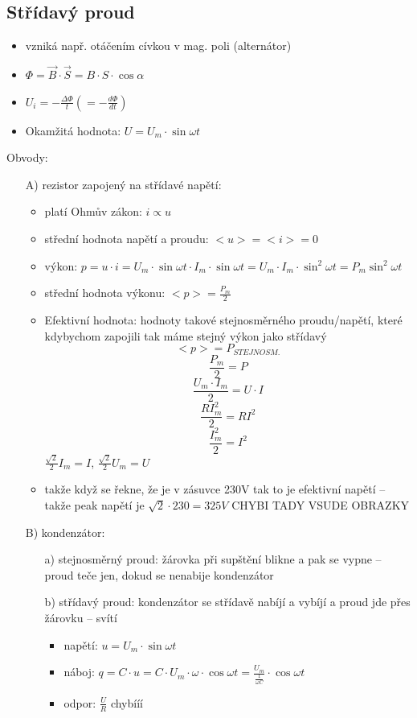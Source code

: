 \documentclass{article}
\begin{document}
\subsection{Střídavý proud}
\begin{itemize}
  \item vzniká např. otáčením cívkou v mag. poli (alternátor)
  \item $\Phi = \overrightarrow{B} \cdot \overrightarrow{S} = B \cdot S \cdot \cos \alpha$
  \item $U_i = -\frac{\Delta \Phi}{t} (= -\frac{d \Phi}{dt})$
  \item Okamžitá hodnota: $U = U_m \cdot \sin \omega t$
\end{itemize}
Obvody:
\begin{itemize}
  \item[A)] rezistor zapojený na střídavé napětí:
  \begin{itemize}
    \item platí Ohmův zákon: $i \propto u$
    \item střední hodnota napětí a proudu: $<u> = <i> = 0$
    \item výkon: $p = u \cdot i = U_m \cdot \sin \omega t \cdot I_m \cdot \sin \omega t = U_m \cdot I_m \cdot \sin^2 \omega t = P_m \sin^2 \omega t$
    \item střední hodnota výkonu: $<p> = \frac{P_m}{2}$
    \item Efektivní hodnota: hodnoty takové stejnosměrného proudu/napětí, které kdybychom zapojili tak máme stejný výkon jako střídavý
    $$<p> = P_{STEJNOSM.}$$
    $$\frac{P_m}{2} = P$$
    $$\frac{U_m \cdot I_m}{2} = U \cdot I$$
    $$\frac{RI_m^2}{2} = RI^2$$
    $$\frac{I_m^2}{2} = I^2$$
    $\frac{\sqrt{2}}{2}I_m = I$, $\frac{\sqrt{2}}{2}U_m = U$
    \item takže když se řekne, že je v zásuvce 230V tak to je efektivní napětí -- takže peak napětí je $\sqrt{2} \cdot 230 = 325 V$  CHYBI TADY VSUDE OBRAZKY
  \end{itemize}
  \item[B)] kondenzátor:
  \begin{itemize}
    \item[a)] stejnosměrný proud: žárovka při supštění blikne a pak se vypne -- proud teče jen, dokud se nenabije kondenzátor
    \item[b)] střídavý proud: kondenzátor se střídavě nabíjí a vybíjí a proud jde přes žárovku -- svítí
    \begin{itemize}
      \item napětí: $u = U_m \cdot \sin \omega t$
      \item náboj: $q = C \cdot u = C \cdot U_m \cdot \omega \cdot \cos \omega t =  \frac{U_m}{\frac{1}{\omega C}} \cdot \cos \omega t$
      \item odpor: $\frac{U}{R}$ chybííí
    \end{itemize}
  \end{itemize}

\end{itemize}
\end{document}
